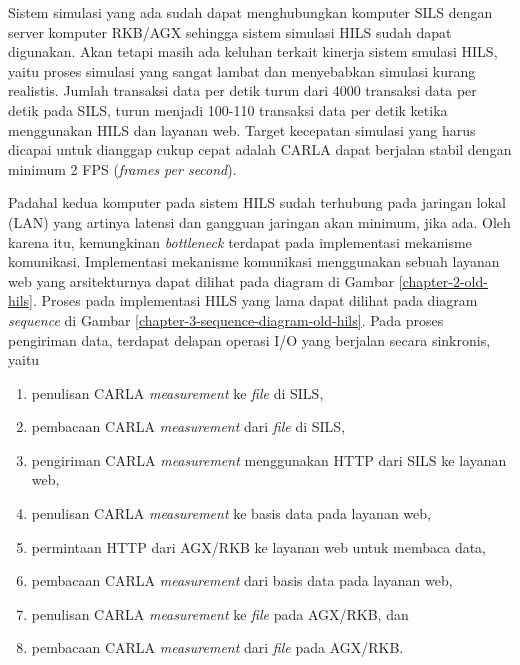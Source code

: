 Sistem simulasi yang ada sudah dapat menghubungkan komputer SILS dengan server
komputer RKB/AGX sehingga sistem simulasi HILS sudah dapat digunakan. Akan
tetapi masih ada keluhan terkait kinerja sistem smulasi HILS, yaitu proses
simulasi yang sangat lambat dan menyebabkan simulasi kurang realistis. Jumlah
transaksi data per detik turun dari 4000 transaksi data per detik pada SILS,
turun menjadi 100-110 transaksi data per detik ketika menggunakan HILS dan
layanan web. Target kecepatan simulasi yang harus dicapai untuk dianggap cukup
cepat adalah CARLA dapat berjalan stabil dengan minimum 2 FPS (\textit{frames
	per second}).

Padahal kedua komputer pada sistem HILS sudah terhubung pada jaringan lokal
(LAN) yang artinya latensi dan gangguan jaringan akan minimum, jika ada.
Oleh karena itu, kemungkinan \textit{bottleneck} terdapat pada implementasi
mekanisme komunikasi. Implementasi mekanisme komunikasi menggunakan sebuah
layanan web yang arsitekturnya dapat dilihat pada diagram di Gambar
\ref{chapter-2-old-hils}. Proses pada implementasi HILS yang lama dapat dilihat
pada diagram \textit{sequence} di Gambar
\ref{chapter-3-sequence-diagram-old-hils}. Pada proses pengiriman data, terdapat
delapan operasi I/O yang berjalan secara sinkronis, yaitu
\begin{enumerate}
	\item penulisan CARLA \textit{measurement} ke \textit{file} di SILS,
	\item pembacaan CARLA \textit{measurement} dari \textit{file} di SILS,
	\item pengiriman CARLA \textit{measurement} menggunakan HTTP dari SILS ke
	      layanan web,
	\item penulisan CARLA \textit{measurement} ke basis data pada layanan web,
	\item permintaan HTTP dari AGX/RKB ke layanan web untuk membaca data,
	\item pembacaan CARLA \textit{measurement} dari basis data pada layanan web,
	\item penulisan CARLA \textit{measurement} ke \textit{file} pada AGX/RKB,
	      dan
	\item pembacaan CARLA \textit{measurement} dari \textit{file} pada AGX/RKB.
\end{enumerate}

